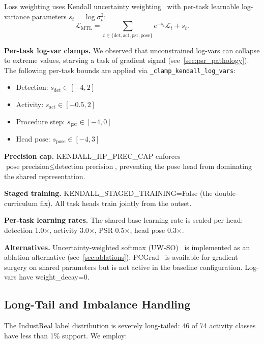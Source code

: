 \documentclass[conference]{IEEEtran}
\begin{document}
Loss weighting uses Kendall uncertainty weighting~\cite{kendall2018multi} with per-task learnable log-variance parameters $s_t = \log\sigma_t^2$:
\begin{equation}
\mathcal{L}_{\text{MTL}} = \sum_{t \in \{\text{det},\text{act},\text{psr},\text{pose}\}} e^{-s_t} \mathcal{L}_t + s_t.
\label{eq:kendall}
\end{equation}

\textbf{Per-task log-var clamps.} We observed that unconstrained log-vars can collapse to extreme values, starving a task of gradient signal (see~\cref{sec:psr_pathology}). The following per-task bounds are applied via \texttt{\_clamp\_kendall\_log\_vars}:
\begin{itemize}
    \item Detection: $s_{\text{det}} \in [-4, 2]$
    \item Activity: $s_{\text{act}} \in [-0.5, 2]$
    \item Procedure step: $s_{\text{psr}} \in [-4, 0]$
    \item Head pose: $s_{\text{pose}} \in [-4, 3]$
\end{itemize}

\textbf{Precision cap.} KENDALL\_HP\_PREC\_CAP enforces $\text{pose precision} \leq \text{detection precision}$, preventing the pose head from dominating the shared representation.

\textbf{Staged training.} KENDALL\_STAGED\_TRAINING=False (the double-curriculum fix). All task heads train jointly from the outset.

\textbf{Per-task learning rates.} The shared base learning rate is scaled per head: detection 1.0$\times$, activity 3.0$\times$, PSR 0.5$\times$, head pose 0.3$\times$.

\textbf{Alternatives.} Uncertainty-weighted softmax (UW-SO)~\cite{guo2018uwso} is implemented as an ablation alternative (see~\cref{sec:ablations}). PCGrad~\cite{yu2020pcgrad} is available for gradient surgery on shared parameters but is not active in the baseline configuration. Log-vars have weight\_decay=0.

\subsection{Long-Tail and Imbalance Handling}
\label{sec:longtail}

The IndustReal label distribution is severely long-tailed: 46 of 74 activity classes have less than 1\% support. We employ:
\end{document}
